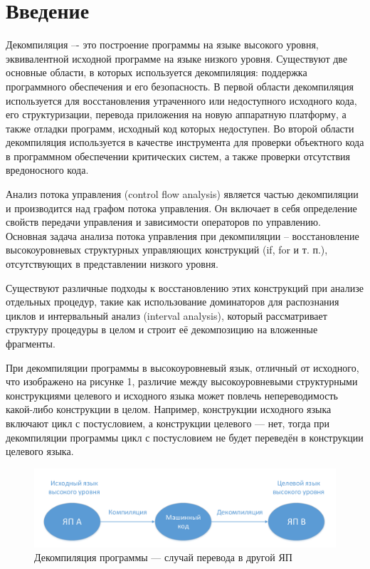\section*{Введение}

Декомпиляция –- это построение программы на языке высокого уровня, эквивалентной исходной программе на языке низкого уровня. Существуют две основные области, в которых используется декомпиляция: поддержка программного обеспечения и его безопасность. В первой области декомпиляция используется для восстановления утраченного или недоступного исходного кода, его структуризации, перевода приложения на новую аппаратную платформу, а также отладки программ, исходный код которых недоступен. Во второй области декомпиляция используется в качестве инструмента для проверки объектного кода в программном обеспечении критических систем, а также проверки отсутствия вредоносного кода.

Анализ потока управления (control flow analysis) является частью декомпиляции и производится над графом потока управления. Он включает в себя определение свойств передачи управления и зависимости операторов по управлению. Основная задача анализа потока управления при декомпиляции – восстановление высокоуровневых структурных управляющих конструкций (if, for и т. п.), отсутствующих в представлении низкого уровня\cite{reengineering}. 

Существуют различные подходы к восстановлению этих конструкций при анализе отдельных процедур, такие как использование доминаторов для распознания циклов и интервальный анализ (interval analysis), который рассматривает структуру процедуры в целом и строит её декомпозицию на вложенные фрагменты\cite{controlflow}.


При декомпиляции программы в высокоуровневый язык, отличный от исходного, что изображено на рисунке 1, различие между высокоуровневыми структурными конструкциями целевого и исходного языка может повлечь непереводимость какой-либо конструкции в целом. Например, конструкции исходного языка включают цикл с постусловием, а конструкции целевого --- нет, тогда при декомпиляции программы цикл с постусловием не будет переведён в конструкции целевого языка.

\begin{figure}[H]
\includegraphics[width=1\linewidth]{Zabransky/gr1.pdf} 
\caption{Декомпиляция программы --- случай перевода в другой ЯП}
\end{figure}


